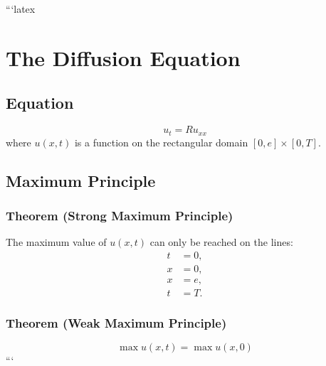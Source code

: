 ```latex
\section*{The Diffusion Equation}

\subsection*{Equation}
\begin{equation}
    u_t = R u_{xx}
\end{equation}
where \( u(x, t) \) is a function on the rectangular domain \([0, e] \times [0, T]\).

\subsection*{Maximum Principle}

\subsubsection*{Theorem (Strong Maximum Principle)}
The maximum value of \( u(x, t) \) can only be reached on the lines:
\begin{align*}
    t &= 0, \\
    x &= 0, \\
    x &= e, \\
    t &= T.
\end{align*}

\subsubsection*{Theorem (Weak Maximum Principle)}
\begin{equation}
    \max u(x, t) = \max u(x, 0)
\end{equation}
```
